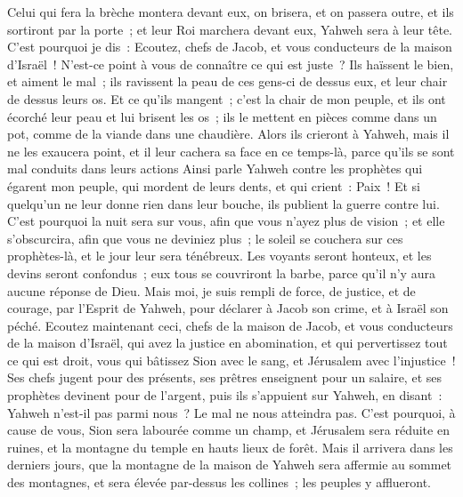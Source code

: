 \begin{multicols}{2}
Celui qui fera la brèche montera devant eux, on brisera, et on passera outre, et ils sortiront par la porte~; et leur Roi marchera devant eux, Yahweh sera à leur tête.
\VerseOne{}C'est pourquoi je dis~: Ecoutez, chefs de Jacob, et vous conducteurs de la maison d'Israël~! N'est-ce point à vous de connaître ce qui est juste~?
Ils haïssent le bien, et aiment le mal~; ils ravissent la peau de ces gens-ci de dessus eux, et leur chair de dessus leurs os.
 Et ce qu'ils mangent~; c'est la chair de mon peuple, et ils ont écorché leur peau et lui brisent les os~; ils le mettent en pièces comme dans un pot, comme de la viande dans une chaudière.
Alors ils crieront à Yahweh, mais il ne les exaucera point, et il leur cachera sa face en ce temps-là, parce qu'ils se sont mal conduits dans leurs actions
Ainsi parle Yahweh contre les prophètes qui égarent mon peuple, qui mordent de leurs dents, et qui crient~: Paix~! Et si quelqu'un ne leur donne rien dans leur bouche, ils publient la guerre contre lui.
C'est pourquoi la nuit sera sur vous, afin que vous n'ayez plus de vision~; et elle s'obscurcira, afin que vous ne deviniez plus~; le soleil se couchera sur ces prophètes-là, et le jour leur sera ténébreux.
Les voyants seront honteux, et les devins seront confondus~; eux tous se couvriront la barbe, parce qu'il n'y aura aucune réponse de Dieu.
Mais moi, je suis rempli de force, de justice, et de courage, par l'Esprit de Yahweh, pour déclarer à Jacob son crime, et à Israël son péché.
Ecoutez maintenant ceci, chefs de la maison de Jacob, et vous conducteurs de la maison d'Israël, qui avez la justice en abomination, et qui pervertissez tout ce qui est droit,
vous qui bâtissez Sion avec le sang, et Jérusalem avec l'injustice~!
Ses chefs jugent pour des présents, ses prêtres enseignent pour un salaire, et ses prophètes devinent pour de l'argent, puis ils s'appuient sur Yahweh, en disant~: Yahweh n'est-il pas parmi nous~? Le mal ne nous atteindra pas.
C'est pourquoi, à cause de vous, Sion sera labourée comme un champ, et Jérusalem sera réduite en ruines, et la montagne du temple en hauts lieux de forêt.
\VerseOne{}Mais il arrivera dans les derniers jours, que la montagne de la maison de Yahweh sera affermie au sommet des montagnes, et sera élevée par-dessus les collines~; les peuples y afflueront.

\end{multicols}
